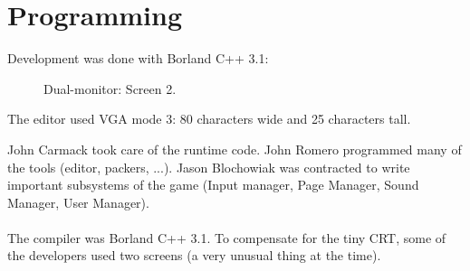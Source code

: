 \documentclass[book.tex]{subfiles}
\begin{document}
\section{Programming}

Development was done with Borland C++ 3.1:\\
\begin{figure}[H]
\centering
\caption{Dual-monitor: Screen 2.}
\label{fig:dm1}
\end{figure}

The editor used VGA mode 3: 80 characters wide and 25 characters tall.

John Carmack took care of the runtime code. John Romero programmed many of the tools (editor, packers, ...). Jason Blochowiak was contracted to write important subsystems of the game (Input manager, Page Manager, Sound Manager, User Manager).\\
\\
The compiler was Borland C++ 3.1. To compensate for the tiny CRT, some of the developers used two screens (a very unusual thing at the time).\\
\end{document}
